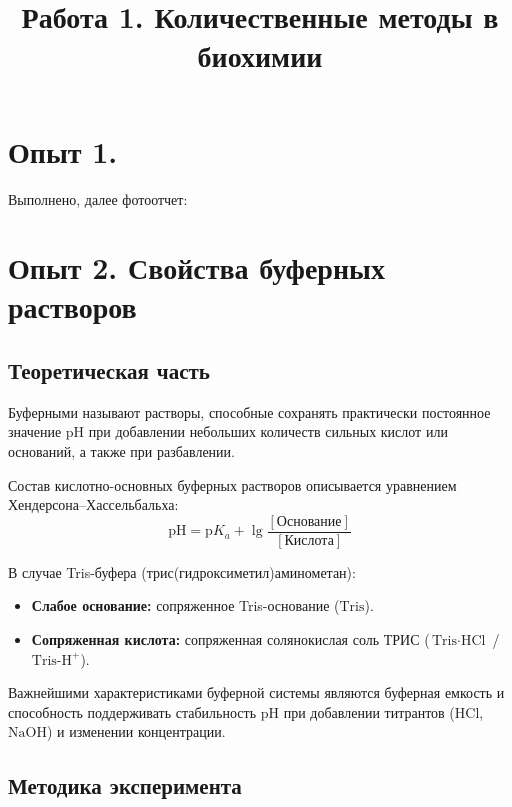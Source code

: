 \documentclass[a4paper,12pt]{article}
\title{\textbf{Работа 1. Количественные методы в биохимии}}\\
\begin{document}
\maketitle

\section*{Опыт 1. }

 

Выполнено, далее фотоотчет:
\newpage 
\section*{Опыт 2. Свойства буферных растворов}

\subsection*{Теоретическая часть}

Буферными называют растворы, способные сохранять практически постоянное значение $\text{pH}$ при добавлении небольших количеств сильных кислот или оснований, а также при разбавлении.

Состав кислотно-основных буферных растворов описывается уравнением Хендерсона--Хассельбальха:
\begin{equation}
\text{pH} = \text{p}K_a + \lg \frac{[\text{Основание}]}{[\text{Кислота}]}
\end{equation}

В случае Tris-буфера (трис(гидроксиметил)аминометан):
\begin{itemize}
    \item \textbf{Слабое основание:} сопряженное Tris-основание ($\text{Tris}$).
    \item \textbf{Сопряженная кислота:} сопряженная солянокислая соль ТРИС ($\text{Tris}\cdot\text{HCl}$ / $\text{Tris-H}^+$).
\end{itemize}

Важнейшими характеристиками буферной системы являются буферная емкость и способность поддерживать стабильность $\text{pH}$ при добавлении титрантов ($\text{HCl}$, $\text{NaOH}$) и изменении концентрации.

\subsection*{Методика эксперимента}
\end{document}
